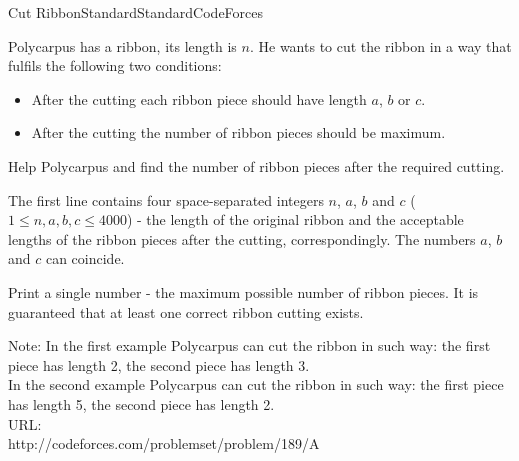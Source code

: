 \begin{problema}{Cut Ribbon}{Standard}{Standard}{CodeForces}


Polycarpus has a ribbon, its length is $n$. He wants to cut the ribbon in a way that fulfils the following two conditions: 
\begin{itemize}
\item After the cutting each ribbon piece should have length $a$, $b$ or $c$. \\
 
\item After the cutting the number of ribbon pieces should be maximum. \\
\end{itemize} 


Help Polycarpus and find the number of ribbon pieces after the required cutting.




\InputFile

The first line contains four space-separated integers $n$, $a$, $b$ and $c$ ($1 \leq n,a,b,c \leq 4000$) - the length of the original ribbon and the acceptable lengths of the ribbon pieces after the cutting, correspondingly. The numbers $a$, $b$ and $c$ can coincide.  \\ 


\OutputFile

Print a single number - the maximum possible number of ribbon pieces. It is guaranteed that at least one correct ribbon cutting exists. \\



\Example



Note: In the first example Polycarpus can cut the ribbon in such way: the first piece has length 2, the second piece has length 3. \\

In the second example Polycarpus can cut the ribbon in such way: the first piece has length 5, the second piece has length 2.
\\

URL:\\ 
http://codeforces.com/problemset/problem/189/A


\end{problema}

